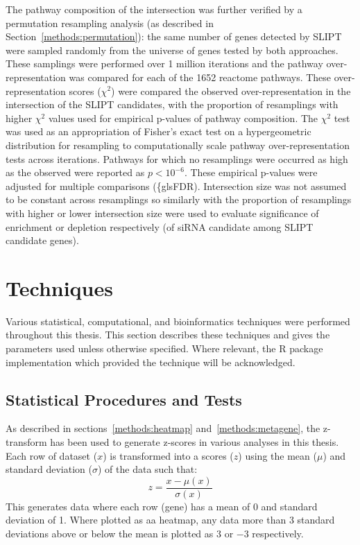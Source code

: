 The \gls{pathway} composition of the intersection was further verified by a permutation resampling analysis (as described in Section~\ref{methods:permutation}): the same number of genes detected by \gls{SLIPT} were sampled randomly from the universe of genes tested by both approaches. These samplings were performed over 1 million iterations and the \gls{pathway} over-representation was compared for each of the 1652 reactome \glspl{pathway}.
These over-representation scores ($\chi^2$) were compared the observed over-representation in the intersection of the \gls{SLIPT} candidates, with the proportion of resamplings with higher $\chi^2$ values used for empirical p-values of \gls{pathway} composition. The $\chi^2$ test was used as an appropriation of Fisher's exact test on a hypergeometric distribution for resampling to computationally scale \gls{pathway} over-representation tests across iterations.  Pathways for which no resamplings were occurred as high as the observed were reported as $p < 10^{-6}$. These empirical p-values were adjusted for multiple comparisons (\{gls{FDR}). Intersection size was not assumed to be constant across resamplings so similarly with the proportion of resamplings with higher or lower intersection size were used to evaluate significance of enrichment or depletion respectively (of \gls{siRNA} candidate among \gls{SLIPT} candidate genes).  

\section{Techniques}
Various statistical, computational, and \gls{bioinformatics} techniques were performed throughout this thesis. This section describes these techniques and gives the parameters used unless otherwise specified. Where relevant, the R package implementation which provided the technique will be acknowledged. 

\subsection{Statistical Procedures and Tests}

As described in sections~\ref{methods:heatmap} and~\ref{methods:metagene}, the z-transform has been used to generate z-scores in various analyses in this thesis. Each row of dataset ($x$) is transformed into a scores ($z$) using the mean ($\mu$) and standard deviation ($\sigma$) of the data such that: $$ z = \frac{x - \mu(x)}{\sigma(x)} $$
This generates data where each row (gene) has a mean of 0 and standard deviation of 1. Where plotted as aa heatmap, any data more than 3 standard deviations above or below the mean is plotted as $3$ or $-3$ respectively.

